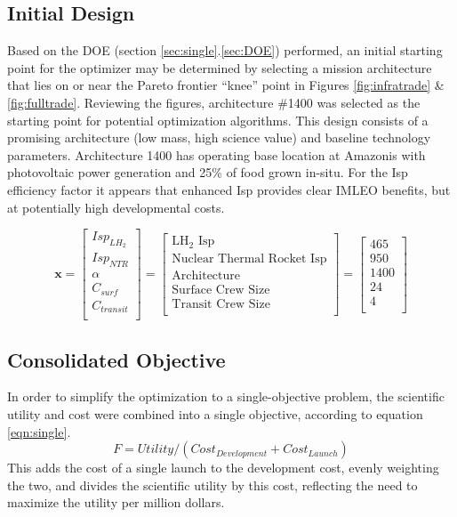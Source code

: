 \documentclass[]{aiaa-pretty}
\begin{document}
\subsection{Initial Design}
Based on the DOE (section \ref{sec:single}.\ref{sec:DOE}) performed, an initial starting point for the optimizer may be determined by selecting a mission architecture that lies on or near the Pareto frontier “knee” point in Figures \ref{fig:infratrade} \& \ref{fig:fulltrade}. Reviewing the figures, architecture \#1400 was selected as the starting point for potential optimization algorithms. This design  consists of a promising architecture (low mass, high science value) and baseline technology parameters. Architecture 1400 has operating base location at Amazonis with photovoltaic power generation and 25\% of food grown in-situ. For the Isp efficiency factor it appears that enhanced Isp provides clear IMLEO benefits, but at potentially high developmental costs.

\begin{equation*}
\mathbf{x}=
\begin{bmatrix}
Isp_{LH_2}\\
Isp_{NTR}\\
\alpha\\
C_{surf}\\
C_{transit}\\
\end{bmatrix}
=
\begin{bmatrix}
\mbox{LH}_2\mbox{ Isp}\\
\mbox{Nuclear Thermal Rocket Isp}\\
\mbox{Architecture}\\
\mbox{Surface Crew Size}\\
\mbox{Transit Crew Size}\\
\end{bmatrix}
=
\begin{bmatrix}
465\\
950\\
1400\\
24\\
4\\
\end{bmatrix}
\end{equation*}

\subsection{Consolidated Objective}
In order to simplify the optimization to a single-objective problem, the scientific utility and cost were combined into a single objective, according to equation \ref{eqn:single}.
\begin{equation}
F = Utility/(Cost_{Development}+Cost_{Launch})
\label{eqn:single}
\end{equation}
This adds the cost of a single launch to the development cost, evenly weighting the two, and divides the scientific utility by this cost, reflecting the need to maximize the utility per million dollars.
\end{document}
